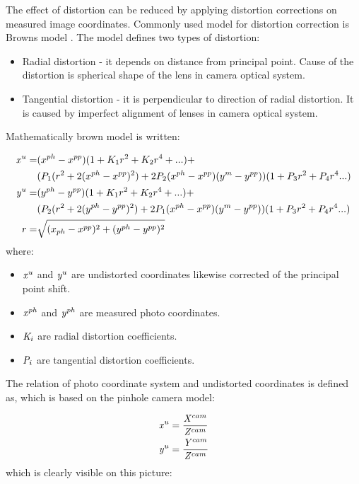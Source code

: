 \documentclass[a4paper,12pt]{report}
\newcommand{\escal}[1]{
{\it #1}
}
\begin{document}
The effect of distortion can be reduced by applying distortion corrections on measured image coordinates. Commonly 
used model for distortion correction is Browns model \cite{brown1966distortion}.
The model defines two types of distortion:
\begin{itemize}
  \item Radial distortion - it depends on distance from principal point. Cause of the distortion is spherical shape of the 
  lens in camera optical system.
  \item Tangential distortion - it is perpendicular to direction of radial distortion. It is caused by 
       imperfect alignment of lenses in camera optical system.
\end{itemize}

Mathematically brown model is written:

\begin{equation}
\label{eq:undistort}
\begin{split}
\escal{x}^{u} =& (x^{ph} - x^{pp})(1 + K_{1}r^2 + K_2r^4 + ...) + \\
&(P_1(r^2 + 2(x^{ph} - x^{pp})^2) + 2P_2(x^{ph} - x^{pp})(y^{m} - y^{pp}))(1 + P_3r^2 + P_4r^4 ...) \\
\escal{y}^{u} =& (y^{ph} - y^{pp})(1 + K_1r^2 + K_2r^4 + ...) + \\
&(P_2(r^2 + 2(y^{ph} - y^{pp})^2) + 2P_1(x^{ph} - x^{pp})(y^{m} - y^{pp}))(1 + P_3r^2 + P_4r^4 ...) \\
r =& \sqrt{(x_{ph} - x^{pp})^2 + (y^{ph} - y^{pp})^2}
\end{split}
\end{equation}
where:
\begin{itemize}
  \item $\escal{x}^{u}$ and $\escal{y}^{u}$  are undistorted coordinates likewise corrected of the principal point shift.
  \item $\escal{x}^{ph}$ and $\escal{y}^{ph}$ are measured photo coordinates.
  \item $\escal{K}_{i}$ are radial distortion coefficients.
  \item $\escal{P}_{i}$ are tangential distortion coefficients.
\end{itemize}


The relation of photo coordinate system and undistorted coordinates is defined as, which is based on the pinhole camera model:

\begin{equation}
\begin{split}
&\escal{x}^{u} = \frac{\escal{X}^{cam}}{\escal{Z}^{cam}} \\
&\escal{y}^{u} = \frac{\escal{Y}^{cam}}{\escal{Z}^{cam}}
\end{split}
\end{equation}
which is clearly visible on this picture:
\end{document}
